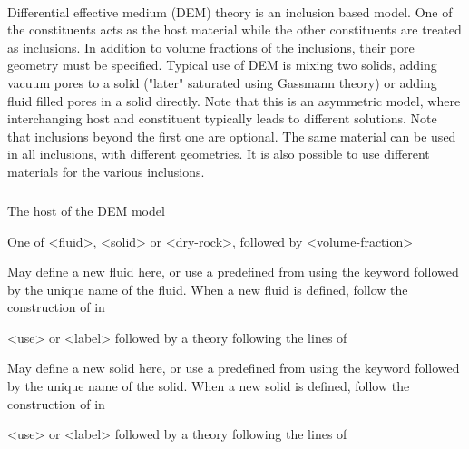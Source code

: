 {\paragraph{}
 \slist
   \item \Description Differential effective medium (DEM) theory is an inclusion based model. One of the constituents acts as the host material while the other constituents are treated as inclusions. In addition to volume fractions of the inclusions, their pore geometry must be specified. Typical use of DEM is mixing two solids, adding vacuum pores to a solid ("later" saturated using Gassmann theory) or adding fluid filled pores in a solid directly. Note that this is an asymmetric model, where interchanging host and constituent typically leads to different solutions. Note that inclusions beyond the first one are optional. The same material can be used in all inclusions, with different geometries. It is also possible to use different materials for the various inclusions.
   \item \Argument
   \item \Default 
 \elist

\subparagraph{}
 \slist
   \item \Description The host of the DEM model
   \item \Argument One of <fluid>, <solid> or <dry-rock>, followed by <volume-fraction>
   \item \Default
 \elist

 \slist
   \item \Description May define a new fluid here, or use a predefined  from  using the keyword  followed by the unique name of the fluid. When a new fluid is defined, follow the construction of  in 
   \item \Argument <use> or <label> followed by a theory following the lines of 
   \item \Default
 \elist

 \slist
   \item \Description May define a new solid here, or use a predefined  from  using the keyword  followed by the unique name of the solid. When a new solid is defined, follow the construction of  in 
   \item \Argument <use> or <label> followed by a theory following the lines of 
   \item \Default
 \elist

}

